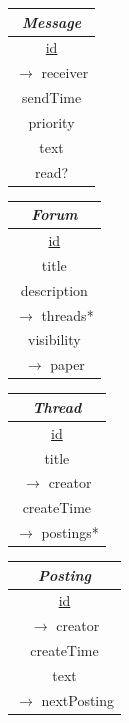 \documentclass[a4paper, 12pt]{scrartcl}
\begin{document}
    \begin{tabular}{|c|}
      \hline
      \emph{Message} \\
      \hline
      \underline{id} \\
      $\longrightarrow$ receiver \\
      sendTime \\
      priority \\
      text \\
      read? \\
      \hline
    \end{tabular}
    \begin{tabular}{|c|}
      \hline
      \emph{Forum} \\
      \hline
      \underline{id} \\
      title \\
      description \\
      $\longrightarrow$ threads* \\
      visibility \\
      $\longrightarrow$ paper \\
      \hline
    \end{tabular}
    \begin{tabular}{|c|}
      \hline
      \emph{Thread} \\
      \hline
      \underline{id} \\
      title \\
      $\longrightarrow$ creator \\
      createTime \\
      $\longrightarrow$ postings* \\
      \hline
    \end{tabular}
    \begin{tabular}{|c|}
      \hline
      \emph{Posting} \\
      \hline
      \underline{id} \\
      $\longrightarrow$ creator \\
      createTime \\
      text \\
      $\longrightarrow$ nextPosting \\
      \hline
    \end{tabular}\\
\end{document}
